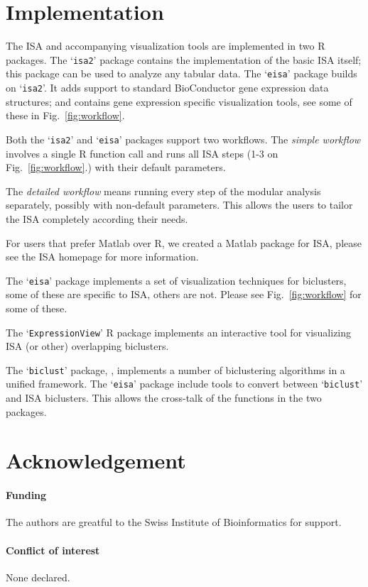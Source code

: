 \documentclass{bioinfo}
\newcommand{\Rpackage}[1]{`\texttt{#1}'}
\begin{document}
\section{Implementation}%
\label{sec:implementation}

The ISA and accompanying visualization tools are implemented in two R
packages. The \Rpackage{isa2} package contains the implementation of
the basic ISA itself; this package can be used to analyze any tabular
data. The \Rpackage{eisa} package builds on \Rpackage{isa2}. It adds
support to standard BioConductor gene expression data structures; and
contains gene expression specific visualization tools, see some of
these in Fig.~\ref{fig:workflow}.

Both the \Rpackage{isa2} and \Rpackage{eisa} packages support two
workflows. The \emph{simple workflow} involves a single R function
call and runs all ISA steps (1-3 on Fig.~\ref{fig:workflow}.) with
their default parameters.

The \emph{detailed workflow} means running every step of the modular
analysis separately, possibly with non-default parameters. This allows
the users to tailor the ISA completely according their needs.

For users that prefer Matlab over R, we created a Matlab package for
ISA, please see the ISA homepage for more information.


The \Rpackage{eisa} package implements a set of visualization
techniques for biclusters, some of these are specific to ISA, others
are not. Please see Fig.~\ref{fig:workflow} for some of these.

The \Rpackage{ExpressionView} R package implements an interactive tool
for visualizing ISA (or other) overlapping biclusters.


The \Rpackage{biclust} package, \cite{biclust}, implements a number of
biclustering algorithms in a unified framework. The \Rpackage{eisa}
package include tools to convert between \Rpackage{biclust} and ISA
biclusters. This allows the cross-talk of the functions in the two
packages.

\section*{Acknowledgement}

\paragraph{Funding\textcolon} The authors are greatful to the Swiss
Institute of Bioinformatics for support.
\paragraph{Conflict of interest\textcolon} None declared.



\end{document}

